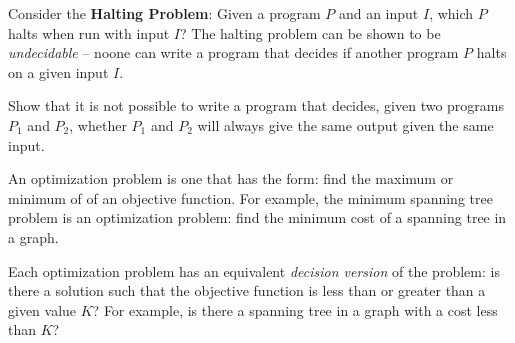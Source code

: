 \documentclass[answers,a4paper,11pt]{exam}
\begin{document}
\begin{questions}
\fillwithdottedlines{5in}

%

\newpage
\question
Consider the \textbf{Halting Problem}: Given a program $P$ and an input $I$, which $P$ halts when run with input $I$?  The halting problem can be shown to be \textit{undecidable} -- noone can write a program that decides if another program $P$ halts on a given input $I$.

Show that it is not possible to write a program that decides, given two programs $P_1$ and $P_2$, whether $P_1$ and $P_2$ will always give the same output given the same input.

\fillwithdottedlines{5in}

\newpage
\question
An optimization problem is one that has the form: find the maximum or minimum of of an objective function.  For example, the minimum spanning tree problem is an optimization problem: find the minimum cost of a spanning tree in a graph.

Each optimization problem has an equivalent \textit{decision version} of the problem: is there a solution such that the objective function is less than or greater than a given value $K$?  For example, is there a spanning tree in a graph with a cost less than $K$?

\fillwithdottedlines{5in}


\end{questions}
\end{document}
